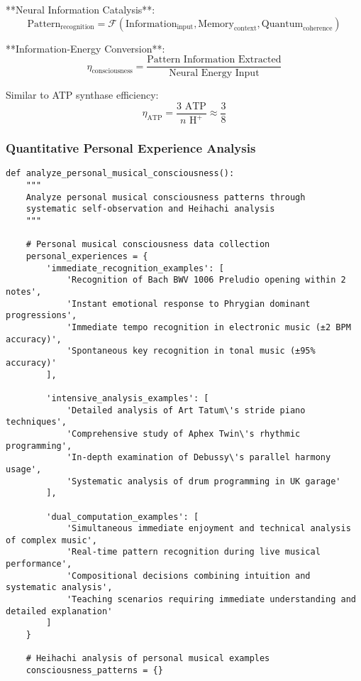 \documentclass[12pt,a4paper]{article}
\begin{document}
**Neural Information Catalysis**:
$$\text{Pattern}_{\text{recognition}} = \mathcal{F}(\text{Information}_{\text{input}}, \text{Memory}_{\text{context}}, \text{Quantum}_{\text{coherence}})$$

**Information-Energy Conversion**:
$$\eta_{\text{consciousness}} = \frac{\text{Pattern Information Extracted}}{\text{Neural Energy Input}}$$

Similar to ATP synthase efficiency:
$$\eta_{\text{ATP}} = \frac{3 \text{ ATP}}{n \text{ H}^+} \approx \frac{3}{8}$$

\subsubsection{Quantitative Personal Experience Analysis}

\begin{lstlisting}[style=pythonstyle, caption=Personal Musical Consciousness Analysis]
def analyze_personal_musical_consciousness():
    """
    Analyze personal musical consciousness patterns through 
    systematic self-observation and Heihachi analysis
    """
    
    # Personal musical consciousness data collection
    personal_experiences = {
        'immediate_recognition_examples': [
            'Recognition of Bach BWV 1006 Preludio opening within 2 notes',
            'Instant emotional response to Phrygian dominant progressions',
            'Immediate tempo recognition in electronic music (±2 BPM accuracy)',
            'Spontaneous key recognition in tonal music (±95% accuracy)'
        ],
        
        'intensive_analysis_examples': [
            'Detailed analysis of Art Tatum\'s stride piano techniques',
            'Comprehensive study of Aphex Twin\'s rhythmic programming',
            'In-depth examination of Debussy\'s parallel harmony usage',
            'Systematic analysis of drum programming in UK garage'
        ],
        
        'dual_computation_examples': [
            'Simultaneous immediate enjoyment and technical analysis of complex music',
            'Real-time pattern recognition during live musical performance',
            'Compositional decisions combining intuition and systematic analysis',
            'Teaching scenarios requiring immediate understanding and detailed explanation'
        ]
    }
    
    # Heihachi analysis of personal musical examples
    consciousness_patterns = {}
    

\end{lstlisting}
\end{document}
